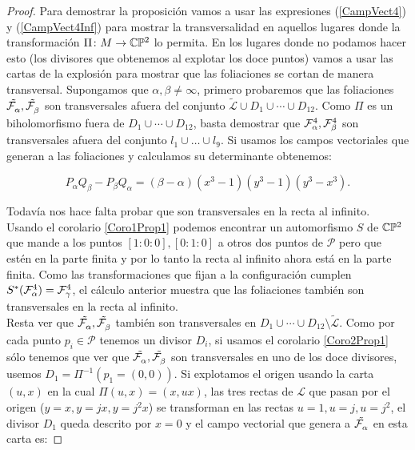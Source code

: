 \begin{proof}
Para demostrar la proposición vamos a usar las expresiones (\ref{CampVect4}) y (\ref{CampVect4Inf}) para mostrar la transversalidad en aquellos lugares donde la transformación $\Pi\colon M\rightarrow \CP$ lo permita. En los lugares donde no podamos hacer esto (los divisores que obtenemos al explotar los doce puntos) vamos a usar las cartas de la explosión para mostrar que las foliaciones se cortan de manera transversal. Supongamos que $\alpha , \beta\neq\infty$, primero probaremos que las foliaciones $\tilde{\Fol{\alpha}},\tilde{\Fol{\beta}}$ son transversales afuera del conjunto $\tilde{\mathcal{L}}\cup D_{1}\cup\cdots\cup D_{12}$. Como $\Pi$ es un biholomorfismo fuera de $D_{1}\cup\cdots\cup D_{12}$, basta demostrar que $\Fol[4]{\alpha},\Fol[4]{\beta}$ son transversales afuera del conjunto $l_{1}\cup\ldots\cup l_{9}$. Si usamos los campos vectoriales que generan a las foliaciones y calculamos su determinante obtenemos:

\begin{equation*}
P_{\alpha}Q_{\beta}-P_{\beta}Q_{\alpha}=(\beta - \alpha)(x^{3}-1)(y^{3}-1)(y^{3}-x^{3}).
\end{equation*}

Todavía nos hace falta probar que son transversales en la recta al infinito. Usando  el corolario \ref{Coro1Prop1} podemos encontrar un automorfismo $S$ de $\CP$ que mande a los puntos $[1:0:0],[0:1:0]$ a otros dos puntos de $\mathcal{P}$ pero que estén en la parte finita y por lo tanto la recta al infinito ahora está en la parte finita. Como las transformaciones que fijan a la configuración cumplen $S^{*}(\Fol[4]{\alpha})=\Fol[4]{\gamma}$, el cálculo anterior muestra que las foliaciones también son transversales en la recta al infinito.\\

Resta ver que $\tilde{\Fol{\alpha}},\tilde{\Fol{\beta}}$ también son transversales en $D_{1}\cup\cdots\cup D_{12}\setminus\tilde{\mathcal{L}}$. Como por cada punto $p_{i}\in\mathcal{P}$ tenemos un divisor $D_{i}$, si usamos el corolario \ref{Coro2Prop1} sólo tenemos que ver que $\tilde{\Fol{\alpha}},\tilde{\Fol{\beta}}$ son transversales en uno de los doce divisores, usemos  $D_{1}=\Pi^{-1}(p_{1}=(0,0))$. Si explotamos el origen usando la carta $(u,x)$ en la cual  $\Pi(u,x)=(x,ux)$, las tres rectas de $\mathcal{L}$ que pasan por el origen ($y=x,y=jx,y=j^{2}x$) se transforman en las rectas $u=1,u=j,u=j^{2}$, el divisor $D_{1}$ queda descrito por $x=0$ y el campo vectorial que genera a $\tilde{\Fol{\alpha}}$ en esta carta es:


\end{proof}
